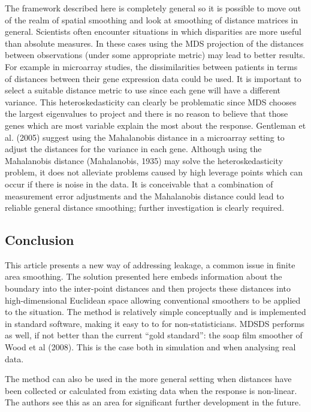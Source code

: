 \documentclass[useAMS, referee]{biom}
\begin{document}
The framework described here is completely general so it is possible to move out of the realm of spatial smoothing and look at smoothing of distance matrices in general. Scientists often encounter situations in which disparities are more useful than absolute measures. In these cases using the MDS projection of the distances between observations (under some appropriate metric) may lead to better results. For example in microarray studies, the dissimilarities between patients in terms of distances between their gene expression data could be used. It is important to select a suitable distance metric to use since each gene will have a different variance. This heteroskedasticity can clearly be problematic since MDS chooses the largest eigenvalues to project and there is no reason to believe that those genes which are most  variable explain the most about the response. Gentleman et al. (2005) suggest using the Mahalanobis distance in a microarray setting to adjust the distances for the variance in each gene. Although using the Mahalanobis distance (Mahalanobis, 1935) may solve the heteroskedasticity problem, it does not alleviate problems caused by high leverage points which can occur if there is noise in the data. It is conceivable that a combination of measurement error adjustments and the Mahalanobis distance could lead to reliable general distance smoothing; further investigation is clearly required.


\subsection{Conclusion}

This article presents a new way of addressing leakage, a common issue in finite area smoothing. The solution presented here embeds information about the boundary into the inter-point distances and then projects these distances into high-dimensional Euclidean space allowing conventional smoothers to be applied to the situation. The method is relatively simple conceptually and is implemented in standard software, making it easy to to for non-statisticians. MDSDS performs as well, if not better than the current ``gold standard'': the soap film smoother of Wood et al (2008). This is the case both in simulation and when analysing real data. 

The method can also be used in the more general setting when distances have been collected or calculated from existing data when the response is non-linear. The authors see this as an area for significant further development in the future.
\end{document}
